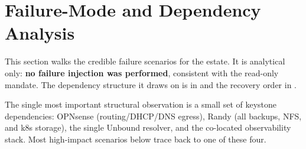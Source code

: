\section{Failure-Mode and Dependency Analysis}\label{sec:fma}

This section walks the credible failure scenarios for the estate. It is analytical only:
\textbf{no failure injection was performed}, consistent with the read-only mandate. The
dependency structure it draws on is in  and the
recovery order in .

The single most important structural observation is a small set of keystone dependencies:
OPNsense (routing/DHCP/DNS egress), Randy (all backups, NFS, and k8s storage), the single
Unbound resolver, and the co-located observability stack. Most high-impact scenarios below
trace back to one of these four.

